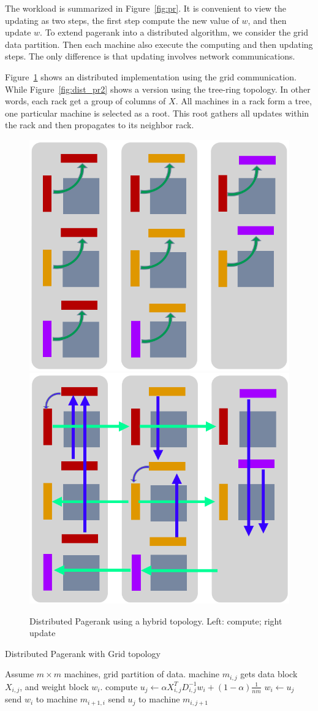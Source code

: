 \documentclass[11pt, twocolumn]{article}
\begin{document}
The workload is summarized in Figure~\ref{fig:pr}. It is convenient to view the
updating as two steps, the
first step compute the new value of $w$, and then update $w$. To extend pagerank
into a distributed algorithm, we consider the grid data partition. Then each
machine also execute the computing and then updating steps. The only difference
is that updating involves network communications.

Figure~\ref{fig:dist_pr} shows an distributed implementation using the grid
communication. While Figure~\ref{fig:dist_pr2} shows a version using the
tree-ring topology. In other words, each rack get a group of columns of $X$. All
machines in a rack form a tree, one particular machine is selected as a
root. This root gathers all updates within the rack and then propagates to its
neighbor rack.

\begin{figure}[th!]
  \centering
  \includegraphics[width=.4\textwidth]{fig/compute} \hspace{4ex}
  \includegraphics[width=.4\textwidth]{fig/update}
  \caption{Distributed Pagerank using a hybrid topology. Left: compute; right update}
  \label{fig:dist_pr}
\end{figure}


\begin{algorithm}[tb]
  \caption{Distributed Pagerank with Grid topology}
  \label{algo:pr}
  \begin{algorithmic}[1]
    \REQUIRE Assume $m\times m$ machines, grid partition of data. machine
    $m_{i,j}$  gets data block $X_{i,j}$, and weight block $w_i$.
    \STATE compute $u_j \gets \alpha X_{i,j}^T D_{i,j}^{-1} w_i + (1-\alpha)\frac{1}{nm}$
    \STATE $w_i \gets u_j$
    \STATE send $w_i$ to machine $m_{i+1,i}$
    \ELSE
    \STATE send $u_j$ to machine $m_{i,j+1}$
    \ENDIF
    \ENDFOR
    \ENDFOR
  \end{algorithmic}
\end{algorithm}
\end{document}
